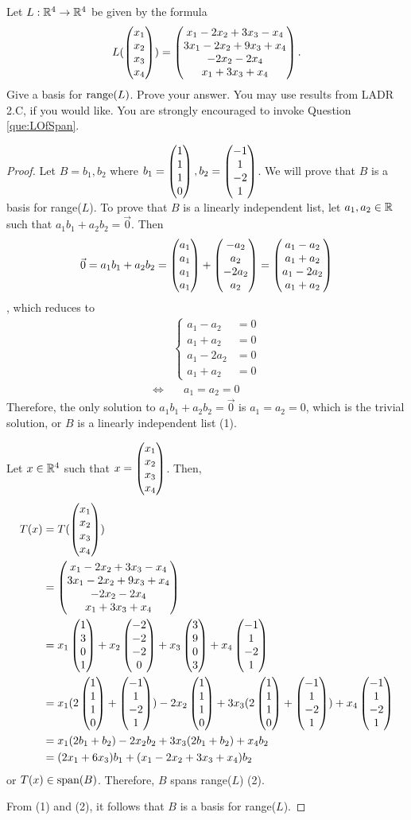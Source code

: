 \begin{question}
	\normalfont
	
	Let $L: {\mathbb R}^4\to{\mathbb R}^4$ be given by the formula
	\begin{align*}
		L(\begin{pmatrix} x_1\\ x_2\\x_3 \\ x_4\end{pmatrix}) = \begin{pmatrix} x_1 - 2x_2 + 3x_3 - x_4\\ 3x_1 -2x_2 + 9x_3 + x_4\\-2x_2 - 2x_4 \\ x_1 + 3x_3 + x_4\end{pmatrix}.
	\end{align*}
	  Give a basis for $\textnormal{range}(L)$.  Prove your answer.  You may use results from LADR 2.C, if you would like.  You are strongly encouraged to invoke Question \ref{que:LOfSpan}.
	
\end{question}

\begin{proof}
    \renewcommand{\qedsymbol}{$\blacksquare$}
    Let $B=b_1,b_2$ where $b_1=\begin{pmatrix} 1\\ 1\\1 \\ 0\end{pmatrix},b_2=\begin{pmatrix} -1\\ 1\\-2 \\ 1\end{pmatrix}$. We will prove that $B$ is a basis for range($L$).
    To prove that $B$ is a linearly independent list, let $a_1,a_2\in\mathbb R$ such that $a_1b_1+a_2b_2=\vec{0}$. 
    Then 
    \[
        \begin{aligned}
            \vec{0} 
            = a_1b_1+a_2b_2
            = \begin{pmatrix} a_1\\ a_1\\a_1 \\ a_1\end{pmatrix}+\begin{pmatrix} -a_2\\ a_2\\-2a_2 \\ a_2\end{pmatrix}
            = \begin{pmatrix} a_1-a_2\\ a_1+a_2\\a_1-2a_2 \\ a_1+a_2\end{pmatrix}
        \end{aligned}
    \]
    , which reduces to 
    \begin{align*}
        &\begin{cases}
            a_1-a_2 &= 0\\
            a_1+a_2 &= 0\\
            a_1-2a_2 &= 0\\
            a_1+a_2 &= 0
        \end{cases}\\
        \iff &\quad a_1=a_2=0
    \end{align*}
    Therefore, the only solution to $a_1b_1+a_2b_2=\vec{0}$ is $a_1=a_2=0$, which is the trivial solution, or $B$ is a linearly independent list (1). 

    Let $x\in\mathbb R^4$ such that $x=\begin{pmatrix} x_1\\ x_2\\x_3 \\ x_4\end{pmatrix}$. Then, 
    \[
        \begin{aligned}
            T(x)
            &= T(\begin{pmatrix} x_1\\ x_2\\x_3 \\ x_4\end{pmatrix})\\
            &= \begin{pmatrix} x_1-2x_2+3x_3-x_4\\ 3x_1-2x_2+9x_3+x_4\\-2x_2-2x_4 \\ x_1+3x_3+x_4\end{pmatrix}\\
            &= x_1 \begin{pmatrix} 1\\ 3\\0 \\ 1\end{pmatrix}+x_2 \begin{pmatrix} -2\\ -2\\-2 \\ 0\end{pmatrix}+x_3 \begin{pmatrix} 3\\ 9\\0 \\ 3\end{pmatrix}+x_4 \begin{pmatrix} -1\\ 1\\-2 \\ 1\end{pmatrix}\\
            &= x_1(2 \begin{pmatrix} 1\\ 1\\1 \\ 0\end{pmatrix}+\begin{pmatrix} -1\\ 1\\-2 \\ 1\end{pmatrix})-2x_2 \begin{pmatrix} 1\\ 1\\1 \\ 0\end{pmatrix}+3x_3(2 \begin{pmatrix} 1\\ 1\\1 \\ 0\end{pmatrix}+\begin{pmatrix} -1\\ 1\\-2 \\ 1\end{pmatrix})+x_4 \begin{pmatrix} -1\\ 1\\-2 \\ 1\end{pmatrix}\\
            &= x_1(2b_1+b_2)-2x_2b_2+3x_3(2b_1+b_2)+x_4b_2\\
            &= (2x_1+6x_3)b_1+(x_1-2x_2+3x_3+x_4)b_2
        \end{aligned}
    \]
    or $T(x)\in\textnormal{span}(B)$. Therefore, $B$ spans range($L$) (2).

    From (1) and (2), it follows that $B$ is a basis for range($L$).
\end{proof}
